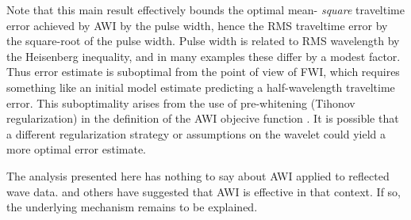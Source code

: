 Note that this main result effectively bounds the optimal mean-{\em
  square} traveltime error achieved by AWI by the pulse width,
hence the RMS traveltime error by the square-root of the pulse
width. Pulse width is related to RMS wavelength by the Heisenberg
inequality, and in many examples these differ by a modest factor.
Thus error estimate is suboptimal from the point of view
of FWI, which requires something like an initial model estimate
predicting a half-wavelength traveltime error. This suboptimality
arises from the use of pre-whitening (Tihonov regularization) in the
definition of the AWI objecive function \cite[]{Warner:16}. It is
possible that a different regularization strategy or assumptions on
the wavelet could yield a more optimal error estimate.


The analysis presented here has nothing to say about AWI applied to
reflected wave data. \cite{Warner:16} and others have
suggested that AWI is effective in that context. If so, the underlying
mechanism remains to be explained. 




